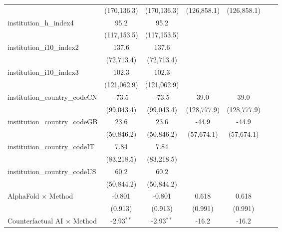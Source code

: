 \begin{tabular}{lcccccc}
                                      & (170,136.3)  & (170,136.3)  & (126,858.1) & (126,858.1) &     &   \\   
   institution\_h\_index4             & 95.2         & 95.2         &             &             &     &   \\   
                                      & (117,153.5)  & (117,153.5)  &             &             &     &   \\   
   institution\_i10\_index2           & 137.6        & 137.6        &             &             &     &   \\   
                                      & (72,713.4)   & (72,713.4)   &             &             &     &   \\   
   institution\_i10\_index3           & 102.3        & 102.3        &             &             &     &   \\   
                                      & (121,062.9)  & (121,062.9)  &             &             &     &   \\   
   institution\_country\_codeCN       & -73.5        & -73.5        & 39.0        & 39.0        &     &   \\   
                                      & (99,043.4)   & (99,043.4)   & (128,777.9) & (128,777.9) &     &   \\   
   institution\_country\_codeGB       & 23.6         & 23.6         & -44.9       & -44.9       &     &   \\   
                                      & (50,846.2)   & (50,846.2)   & (57,674.1)  & (57,674.1)  &     &   \\   
   institution\_country\_codeIT       & 7.84         & 7.84         &             &             &     &   \\   
                                      & (83,218.5)   & (83,218.5)   &             &             &     &   \\   
   institution\_country\_codeUS       & 60.2         & 60.2         &             &             &     &   \\   
                                      & (50,844.2)   & (50,844.2)   &             &             &     &   \\   
   AlphaFold $\times$ Method          & -0.801       & -0.801       & 0.618       & 0.618       &     &   \\   
                                      & (0.913)      & (0.913)      & (0.991)     & (0.991)     &     &   \\   
   Counterfactual AI $\times$ Method  & -2.93$^{**}$ & -2.93$^{**}$ & -16.2       & -16.2       &     &   \\   

\end{tabular}
